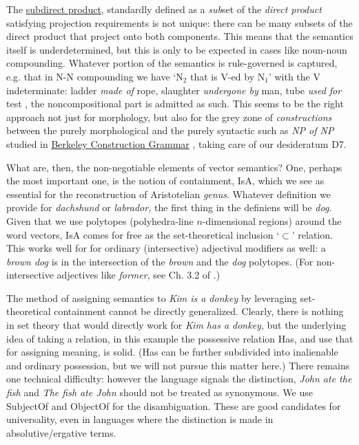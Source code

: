 \documentclass[output=paper,colorlinks=true,citecolor=brown]{langscibook}
\begin{document}
\noindent
The \href{https://en.wikipedia.org/wiki/Subdirect_product}{subdirect product},
standardly defined as a {\it sub}set of the {\it direct product} satisfying
projection requirements is not unique: there can be many subsets of the direct
product that project onto both components. This means that the semantics
itself is underdetermined, but this is only to be expected in cases like
noun-noun compounding. Whatever portion of the semantics is rule-governed is
captured, e.g. that in N-N compounding we have `N$_2$ that is V-ed by N$_1$'
with the V indeterminate: ladder {\it made of} rope, slaughter {\it undergone
  by} man, tube {\it used for} test \citep{Kiparsky:1982b}, the
noncompositional part is admitted as such. This seems to be the right approach
not just for morphology, but also for the grey zone of {\it constructions}
between the purely morphological and the purely syntactic such as {\it NP of
  NP} studied in
\href{https://www1.icsi.berkeley.edu/~kay/bcg/ConGram.html}{Berkeley
  Construction Grammar} \citep{Kornai:1988a}, taking care of our desideratum
D7.

\medskip\noindent What are, then, the non-negotiable elements of vector
semantics? One, perhaps the most important one, is the notion of containment,
{\sc IsA}, which we see as essential for the reconstruction of Aristotelian
{\it genus}. Whatever definition we provide for {\it dachshund} or {\it
  labrador,} the first thing in the definiens will be {\it dog}. Given that we
use polytopes (polyhedra-line $n$-dimensional regions) around the word
vectors, {\sc IsA} comes for free as the set-theoretical inclusion `$\subset$'
relation. This works well for for ordinary (intersective) adjectival modifiers
as well: a {\it brown dog} is in the intersection of the {\it brown} and the
{\it dog} polytopes. (For non-intersective adjectives like {\it former}, see
Ch. 3.2 of \cite{Kornai:2022}.)

The method of assigning semantics to {\it Kim is a donkey} by leveraging
set-theo\-ret\-ical containment cannot be directly generalized.  Clearly,
there is nothing in set theory that would directly work for {\it Kim has a
  donkey}, but the underlying idea of taking a relation, in this example the
possessive relation {\sc Has}, and use that for assigning meaning, is
solid. ({\sc Has} can be further subdivided into inalienable and ordinary
possession, but we will not pursue this matter here.) There remains one
technical difficulty: however the language signals the distinction, {\it John
  ate the fish} and {\it The fish ate John} should not be treated as
synonymous. We use {\sc SubjectOf} and {\sc ObjectOf} for the
disambiguation. These are good candidates for universality, even in languages
where the distinction is made in absolutive/ergative terms.
\end{document}
